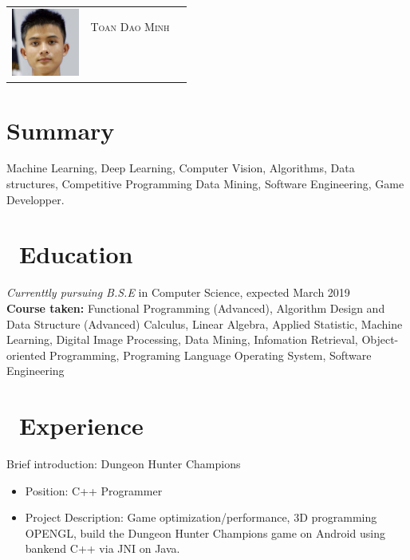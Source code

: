 \documentclass{resume}
\begin{document}

\Large{
  \begin{tabu}{ c l r }
    & \scshape{Toan Dao Minh}  \\
    &   \\
    &   \\
    &   \\
    &  
  \end{tabu}
}

\section{\faHeartO Summary}
Machine Learning, Deep Learning, Computer Vision, Algorithms, Data structures, Competitive Programming
Data Mining, Software Engineering, Game Developper.


\section{\faGraduationCap\ Education}
\textit{Currenttly pursuing B.S.E} in Computer Science, expected March 2019\\
\textbf{Course taken: }Functional Programming (Advanced), Algorithm Design and Data Structure (Advanced)
Calculus, Linear Algebra, Applied Statistic, Machine Learning, Digital Image Processing,
Data Mining, Infomation Retrieval, Object-oriented Programming, Programing Language
Operating System, Software Engineering
\section{\faUsers\ Experience}

Brief introduction: Dungeon Hunter Champions
\begin{itemize}
  \item Position: C++ Programmer
  \item Project Description: Game optimization/performance, 3D programming OPENGL, build the
Dungeon Hunter Champions game on Android using
bankend C++ via JNI on Java.

\end{itemize}
\end{document}
